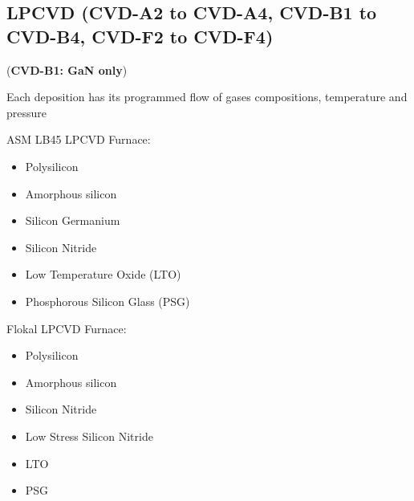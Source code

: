\subsection{LPCVD (CVD-A2 to CVD-A4, CVD-B1 to CVD-B4, CVD-F2 to CVD-F4)}\label{lpcvd_machine}
\WaferClean\WaferSemiClean (\textbf{CVD-B1: GaN only})

\begin{minipage}[H]{\MachinePictureMiniPageWidth}
\end{minipage}\begin{minipage}[H]{\MachineTextMiniPageWidth}
Each deposition has its programmed flow of gases compositions, temperature and pressure

\begin{mdframed}
ASM LB45  LPCVD Furnace:
\begin{itemize}
	\item Polysilicon
	\item Amorphous silicon
	\item Silicon Germanium
	\item Silicon Nitride
	\item Low Temperature Oxide (LTO)
	\item Phosphorous Silicon Glass (PSG)
\end{itemize}
\end{mdframed}\begin{mdframed}
Flokal LPCVD Furnace:
\begin{itemize}
	\item Polysilicon
	\item Amorphous silicon
	\item Silicon Nitride
	\item Low Stress Silicon Nitride
	\item LTO
	\item PSG
\end{itemize}
\end{mdframed}

\end{minipage}